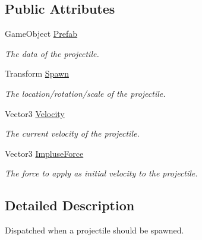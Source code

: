 \subsection*{Public Attributes}
\begin{DoxyCompactItemize}
\item 
Game\-Object \hyperlink{class_skyrates_1_1_client_1_1_game_1_1_event_1_1_event_spawn_entity_projectile_a52d34f0763eb8f05a8270130d416c108}{Prefab}
\begin{DoxyCompactList}\small\item\em The data of the projectile. \end{DoxyCompactList}\item 
Transform \hyperlink{class_skyrates_1_1_client_1_1_game_1_1_event_1_1_event_spawn_entity_projectile_a9e08d311140edf6156e30bcb65c3d257}{Spawn}
\begin{DoxyCompactList}\small\item\em The location/rotation/scale of the projectile. \end{DoxyCompactList}\item 
Vector3 \hyperlink{class_skyrates_1_1_client_1_1_game_1_1_event_1_1_event_spawn_entity_projectile_a585b4f98f506b65fca022f40d8187c1e}{Velocity}
\begin{DoxyCompactList}\small\item\em The current velocity of the projectile. \end{DoxyCompactList}\item 
Vector3 \hyperlink{class_skyrates_1_1_client_1_1_game_1_1_event_1_1_event_spawn_entity_projectile_ac826f11ddba313002aee37d494f72cf4}{Impluse\-Force}
\begin{DoxyCompactList}\small\item\em The force to apply as initial velocity to the projectile. \end{DoxyCompactList}\end{DoxyCompactItemize}


\subsection{Detailed Description}
Dispatched when a projectile should be spawned. 




